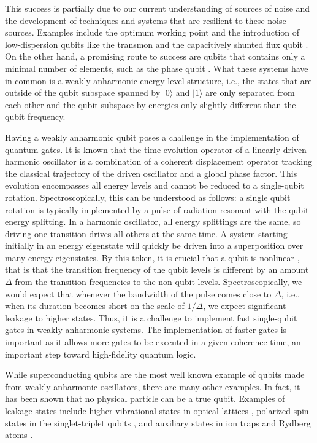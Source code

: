 \documentclass[pra,twocolumn,floatfix,superscriptaddress,eqsecnum]{revtex4-1}
\begin{document}
This success is partially due to our current understanding of sources of noise and the development of techniques and systems that are  resilient to these noise sources. Examples include the optimum working point \cite{Vion2002} and the introduction of low-dispersion qubits like the transmon \cite{Koch2007,Schreier2008} and the capacitively shunted flux
qubit \cite{Steffen2010}. On the other hand, a promising route to success are qubits that contains only a minimal number of elements, such as the phase qubit  \cite{Martinis2002,Steffen2006a,Martinis09c}. What these systems have in common is a weakly anharmonic energy level structure, i.e., the states that are outside of the qubit subspace spanned by $|0\rangle$ and $|1\rangle$ are only separated from each other and the qubit subspace by energies only slightly different than the qubit frequency. 

Having a weakly anharmonic qubit poses a challenge in the implementation of quantum gates. It is known \cite{Husimi53,Feynman65} that the time evolution operator of a linearly driven harmonic oscillator is a combination of a coherent displacement operator tracking the classical trajectory
of the driven oscillator and a global phase factor. This evolution encompasses all energy levels and cannot be reduced to a single-qubit rotation. Spectroscopically, this can be understood as follows: a single qubit rotation is typically implemented by a pulse of radiation resonant with the qubit energy splitting.
In a harmonic oscillator, all energy splittings are the same, so driving one transition drives all others at the same time. A system starting initially in an energy eigenstate will quickly be driven into a superposition over many energy eigenstates. By this token, it is crucial that a qubit is nonlinear \cite{Vion2002,Makhlin2001,Schoelkopf2008,Insight,Khani2009}, that is that the transition frequency of the qubit levels is different by an amount $\Delta$ from the transition frequencies to the non-qubit levels. Spectroscopically, we would expect that whenever the bandwidth of the pulse comes close to $\Delta$, i.e., when its duration becomes short on the scale of $1/\Delta$, we expect
significant leakage to higher states. Thus, it is a challenge to implement fast single-qubit gates in weakly anharmonic systems. The implementation of faster gates is important as it allows more gates to be executed in a given coherence time, an important step toward high-fidelity quantum logic.

While superconducting qubits are the most well known example of qubits made from weakly anharmonic oscillators, there are many other examples. In fact, it has been shown that no physical particle can be a true qubit\cite{Wu02}. Examples of leakage states include higher vibrational states in optical lattices \cite{Maneshi08}, polarized spin states in the singlet-triplet qubits \cite{Petta05}, and auxiliary states in ion traps \cite{Haeffner08} and Rydberg atoms \cite{Urban09,Gaetan09,Haroche2006}.
\end{document}
